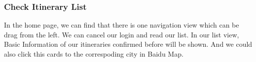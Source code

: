 \documentclass[10pt]{article}
\begin{document}
\subsubsection{Check Itinerary List}
In the home page, we can find that there is one navigation view which can be drag from the left. We can cancel our login and read our list. In our list view, Basic Information of our itineraries confirmed before will be shown. And we could also click this cards to the correspoding city in Baidu Map. 

\begin{figure}[H]
	\centering
	\quad

\end{figure}
\end{document}
